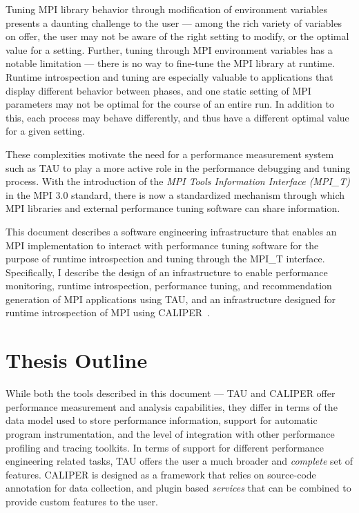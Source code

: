 Tuning MPI library behavior through modification of environment variables presents a daunting challenge to the user --- among the rich variety of variables on offer, the user may not be aware of the right setting to modify, or the optimal value for a setting. Further, tuning through MPI environment variables has a notable limitation --- there is no way to fine-tune the MPI library at runtime. Runtime introspection and tuning are especially valuable to applications that display different behavior between phases, and one static setting of MPI parameters may not be optimal for the course of an entire run. In addition to this, each process may behave differently, and thus have a different optimal value for a given setting. \par
These complexities motivate the need for a performance measurement system such as TAU to play a more active role in the performance debugging and tuning process. With the introduction of the \textit{MPI Tools Information Interface (MPI\_T)} in the MPI 3.0 standard, there is now a standardized mechanism through which MPI libraries and external performance tuning software can share information. 
\par This document describes a software engineering infrastructure that enables an MPI implementation to interact with performance tuning software for the purpose of runtime introspection and tuning through the MPI\_T interface. Specifically, I describe the design of an infrastructure to enable performance monitoring, runtime introspection, performance tuning, and recommendation generation of MPI applications using TAU, and an infrastructure designed for runtime introspection of MPI using CALIPER~\cite{CALIPER}.

\section {Thesis Outline}
While both the tools described in this document --- TAU and CALIPER offer performance measurement and analysis capabilities, they differ in terms of the data model used to store performance information, support for automatic program instrumentation, and the level of integration with other performance profiling and tracing toolkits. In terms of support for different performance engineering related tasks, TAU offers the user a much broader and \textit{complete} set of features. CALIPER is designed as a framework that relies on source-code annotation for data collection, and plugin based \textit{services} that can be combined to provide custom features to the user.

